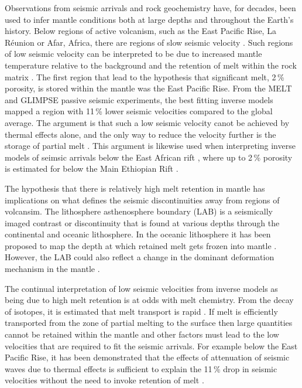 Observations from seismic arrivals and rock geochemistry have, for decades, been used to infer mantle conditions both at large depths and throughout the Earth's history. Below regions of active volcanism, such as the East Pacific Rise, La Réunion or Afar, Africa, there are regions of slow seismic velocity \citep[e.g.][]{forsyth-etal-1998,mazzullo-etal-2017,bastow-etal-2005}. Such regions of low seismic velocity can be interpreted to be due to increased mantle temperature relative to the background and the retention of melt within the rock matrix \citep[e.g.][]{goes-etal-2012,armitage-etal-epsl-2015}. The first region that lead to the hypothesis that significant melt, 2\,\% porosity, is stored within the mantle was the East Pacific Rise. From the MELT and GLIMPSE passive seismic experiments, the best fitting inverse models mapped a region with 11\,\% lower seismic velocities compared to the global average. The argument is that such a low seismic velocity canot be achieved by thermal effects alone, and the only way to reduce the velocity further is the storage of partial melt \citep{harmon-etal-2009}. This argument is likewise used when interpreting inverse models of seimsic arrivals below the East African rift \citep[e.g.][]{gallacher-etal-2016,chambers-etal-2019}, where up to 2\,\% porosity is estimated for below the Main Ethiopian Rift \citep{chambers-etal-2019}. 

The hypothesis that there is relatively high melt retention in mantle has implications on what defines the seismic discontinuities away from regions of volcansim. The lithosphere asthenosphere boundary (LAB) is a seismically imaged contrast or discontinuity that is found at various depths through the continental and oceanic lithosphere. In the oceanic lithosphere it has been proposed to map the depth at which retained melt gets frozen into mantle \citep[e.g.][]{hirschmann-2010,mehouachi-2017}. However, the LAB could also reflect a change in the dominant deformation mechanism in the mantle \citep[e.g.][]{karato-2012,goes-etal-2012,beghein-etal-2019}.

The continual interpretation of low seismic velocities from inverse models as being due to high melt retention is at odds with melt chemistry. From the decay of isotopes, it is estimated that melt transport is rapid \citep[e.g.][]{elliot-2014}. If melt is efficiently transported from the zone of partial melting to the surface then large quantities cannot be retained within the mantle and other factors must lead to the low velocities that are required to fit the seismic arrivals. For example below the East Pacific Rise, it has been demonstrated that the effects of attenuation of seismic waves due to thermal effects is sufficient to explain the 11\,\% drop in seismic velocities without the need to invoke retention of melt \citep{goes-etal-2012}.

